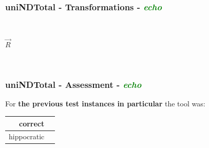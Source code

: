 \documentclass{beamer}
\newcommand{\cmark}{\ding{51}}%
\begin{document}
\begin{frame}
\frametitle{uniNDTotal - \textbf{Transformations} - \textbf{\textit{\textcolor{green}{echo}}}}
\begin{figure}[ht]
\begin{mdframed}
    \centering
    \mbox{\qquad\qquad\qquad
          }
\end{mdframed}          
    \label{fig:T1}
\end{figure}

\begin{center}
$\overrightarrow{R}$
\end{center}

\begin{figure}[ht]
    \centering
    \mbox{
          }
    \label{fig:T3}
\end{figure}

\end{frame}


\begin{frame}
\frametitle{uniNDTotal - \textbf{Assessment} - \textbf{\textit{\textcolor{green}{echo}}}}

For \textbf{the previous test instances in particular} the tool was:

\begin{center}
\begin{tabular}{| r | c |}
  \hline                        
  correct & \cmark\\
  \hline
  hippocratic & \cmark\\
  \hline 
\end{tabular}
\end{center}

\end{frame}
\end{document}
